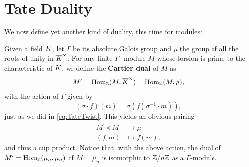 \documentclass[a4paper, oneside]{memoir}
\begin{document}
\section{Tate Duality}
We now define yet another kind of duality, this time for modules:
\begin{definition}
	Given a field \(K\), let  $\Gamma$ be its absolute Galois group and $\mu$ the group of all the roots of unity in $\overline{K}^\times$.
	For any finite \(\Gamma\) -module \(M\) whose torsion is prime to the characteristic of \(K\), we define the \textbf{Cartier dual} of $M$ as
	\begin{equation*}
		M^{\prime} = \operatorname{Hom}_{\mathbb{Z}}(M, \overline{K}^\times)=\operatorname{Hom}_{\mathbb{Z}}(M, \mu),
	\end{equation*}
	with the action of $\Gamma$ given by
	\begin{equation*}
		(\sigma \cdot f)(m) = \sigma(f(\sigma^{-1}\cdot m)),
	\end{equation*}
	just as we did in \eqref{eq:TateTwist}. This yields an obvious pairing
	\begin{align*}
		M^{\prime}\times M & \to \mu       \\
		(f,m)              & \mapsto f(m),
	\end{align*}
	and thus a cup product.
	Notice that, with the above action, the dual of $M^{\prime} = \operatorname{Hom}_{\mathbb{Z}}(\mu_n, \mu_n)$ of $M=\mu_n$ is isomorphic to $\mathbb{Z}/n\mathbb{Z}$ as a $\Gamma$-module.
\end{definition}
\end{document}
